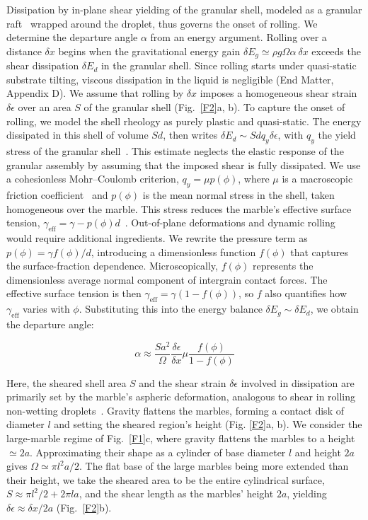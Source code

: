 \documentclass[twocolumn, prl,
 amsmath,amssymb,
 superscriptaddress,aps,
]{revtex4-2}
\begin{document}
Dissipation by in-plane shear yielding of the granular shell, modeled as a granular raft~\cite{cicuta2009granular,protiere2023particle} wrapped around the droplet, thus governs the onset of rolling.
We determine the departure angle $\alpha$ from an energy argument.
Rolling over a distance $\delta x$ begins when the gravitational energy gain $\delta E_g\simeq\rho g\Omega\alpha \ \delta x$ exceeds the shear dissipation $\delta E_d$ in the granular shell.
Since rolling starts under quasi-static substrate tilting, viscous dissipation in the liquid is negligible (End Matter, Appendix D).
We assume that rolling by $\delta x$ imposes a homogeneous shear strain $\delta \epsilon$ over an area $S$ of the granular shell (Fig.~\ref{F2}a, b). To capture the onset of rolling, we model the shell rheology as purely plastic and quasi-static. The energy dissipated in this shell of volume $Sd$, then writes $\delta E_d\sim S d q_y \delta\epsilon$, with $q_y$ the yield stress of the granular shell~\cite{kruyt2006shear}.
This estimate neglects the elastic response of the granular assembly by assuming that the imposed shear is fully dissipated. We use a cohesionless Mohr--Coulomb criterion, $q_y=\mu p(\phi)$, where $\mu$ is a macroscopic friction coefficient~\cite{andreotti2013granular} and $p(\phi)$ is the mean normal stress in the shell, taken homogeneous over the marble.
This stress reduces the marble's effective surface tension, $\gamma_{\mathrm{eff}} = \gamma-p(\phi)d$~\cite{cicuta2009granular,lagubeau2014armoring}.
Out-of-plane deformations and dynamic rolling would require additional ingredients.
We rewrite the pressure term as $p(\phi)= \gamma f(\phi)/d$, introducing a dimensionless function $f(\phi)$ that captures the surface-fraction dependence.
Microscopically, $f(\phi)$ represents the dimensionless average normal component of intergrain contact forces.
The effective surface tension is then  $\gamma_{\mathrm{eff}} = \gamma(1-f(\phi))$, so $f$ also quantifies how $\gamma_\mathrm{eff}$ varies with $\phi$.
 Substituting this into the energy balance $\delta E_g\sim \delta E_d$, we obtain the departure angle:

\begin{equation}
     \alpha \approx \frac{S a^2}{\Omega}\frac{\delta\epsilon}{\delta x}\mu \frac{f(\phi)}{1-f(\phi)}
    \label{eq:model_general}
\end{equation}

Here, the sheared shell area $S$ and the shear strain $\delta \epsilon$ involved in dissipation are primarily set by the marble's aspheric deformation, analogous to shear in rolling non-wetting droplets~\cite{mahadevan1999rolling}.
Gravity flattens the marbles, forming a contact disk of diameter $l$ and setting the sheared region's height (Fig. \ref{F2}a, b).
We consider the large-marble regime of Fig.~\ref{F1}c, where gravity flattens the marbles to a height $\simeq2a$.
Approximating their shape as a cylinder of base diameter $l$ and height $2a$ gives $\Omega\simeq\pi l^2a/2$.
The flat base of the large marbles being more extended than their height, we take the sheared area to be the entire cylindrical surface, $S\approx \pi l^2/2+2\pi l a$, and the shear length as the marbles' height $2a$, yielding $\delta\epsilon\approx\delta x/2a$ (Fig.~\ref{F2}b).
\end{document}
